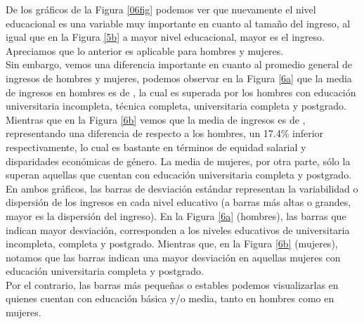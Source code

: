 \documentclass{article}
\begin{document}
	\FloatBarrier
	
	De los gráficos de la Figura \ref{06fig} podemos ver que nuevamente el nivel educacional es una variable muy importante en cuanto al tamaño del ingreso, al igual que en la Figura \ref{5b} a mayor nivel educacional, mayor es el ingreso. Apreciamos que lo anterior es aplicable para hombres y mujeres.\\
	
	Sin embargo, vemos una diferencia importante en cuanto al promedio general de ingresos de hombres y mujeres, podemos observar en la Figura \ref{6a} que la media de ingresos en hombres es de , la cual es superada por los hombres con educación universitaria incompleta, técnica completa, universitaria completa y postgrado. Mientras que en la Figura \ref{6b} vemos que la media de ingresos es de , representando una diferencia de  respecto a los hombres, un 17.4\% inferior respectivamente, lo cual es bastante en términos de equidad salarial y disparidades económicas de género. La media de mujeres, por otra parte, sólo la superan aquellas que cuentan con educación universitaria completa y postgrado.\\
	
	En ambos gráficos, las barras de desviación estándar representan la variabilidad o dispersión de los ingresos en cada nivel educativo (a barras más altas o grandes, mayor es la dispersión del ingreso). En la Figura \ref{6a} (hombres), las barras que indican mayor desviación, corresponden a los niveles educativos de universitaria incompleta, completa y postgrado. Mientras que, en la Figura \ref{6b} (mujeres), notamos que las barras indican una mayor desviación en aquellas mujeres con educación universitaria completa y postgrado.\\
	
	Por el contrario, las barras más pequeñas o estables podemos visualizarlas en quienes cuentan con educación básica y/o media, tanto en hombres como en mujeres.
		
	\FloatBarrier
	
\end{document}
